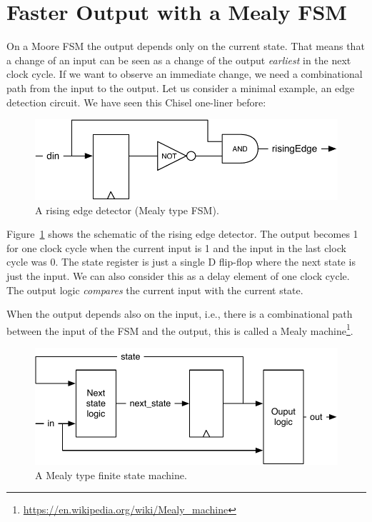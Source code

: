 \documentclass[%
    10pt,
    headinclude, footexclude,
    openright, %
    notitlepage,
    cleardoubleempty,
    headsepline,
    pointlessnumbers,
    bibtotoc, idxtotoc,
    ]{scrbook}
\newcommand{\scale}{0.7}
\newcommand{\myref}[2]{\href{#1}{#2}}
\renewcommand{\myref}[2]{{#2}{\footnote{\url{#1}}}}
\begin{document}
\section{Faster Output with a Mealy FSM}

On a Moore FSM the output depends only on the current state.
That means that a change of an input can be seen as a change of the
output \emph{earliest} in the next clock cycle.
If we want to observe an immediate change, we need a combinational
path from the input to the output.
Let us consider a minimal example, an edge detection circuit.
We have seen this Chisel one-liner before:


\begin{figure}
  \centering
  \includegraphics[scale=\scale]{figures/fsm-rising}
  \caption{A rising edge detector (Mealy type FSM).}
  \label{fig:rising}
\end{figure}

Figure~\ref{fig:rising} shows the schematic of the rising edge detector.
The output becomes 1 for one clock cycle when the current input is 1
and the input in the last clock cycle was 0.
The state register is just a single D flip-flop where the next state
is just the input. We can also consider this as a delay element of one
clock cycle. The output logic \emph{compares} the current
input with the current state.



When the output depends also on the input, i.e., there is a combinational path between
the input of the FSM and the output, this is called a
\myref{https://en.wikipedia.org/wiki/Mealy_machine}{Mealy machine}.

\begin{figure}
  \centering
  \includegraphics[scale=\scale]{figures/mealy}
  \caption{A Mealy type finite state machine.}
  \label{fig:mealy}
\end{figure}
\end{document}
